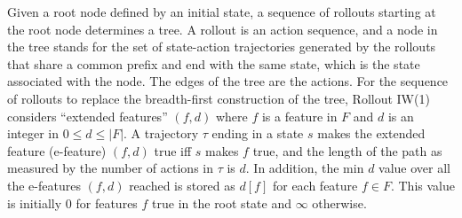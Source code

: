 \documentclass[letterpaper]{article}
\newcommand{\pair}[1]{{(#1)}}
\begin{document}
Given a root node defined by an  initial state, a sequence of rollouts starting at the root node
determines a tree. A rollout is an action sequence, and a node in the tree stands
for the  set of state-action trajectories generated by the rollouts that
share  a common prefix and end with the same  state, which is the state
associated with the node. The edges of the tree are the actions.
For the sequence of rollouts to  replace the breadth-first construction of the tree,
Rollout IW(1) considers ``extended features''  $\pair{f,d}$ where $f$ is a feature in $F$ and $d$ is an integer in
$0 \leq d \leq |F|$. A trajectory  $\tau$ ending in a state $s$ makes the extended feature (e-feature) $\pair{f,d}$ true
iff $s$ makes $f$ true, and the length of the path as measured by the number of actions in $\tau$ is $d$.
In addition, the min $d$ value over all the e-features $\pair{f,d}$ reached is stored as $d[f]$
for each feature $f \in F$. This  value  is initially $0$ for features $f$ true in the root state
and $\infty$ otherwise.
\end{document}
